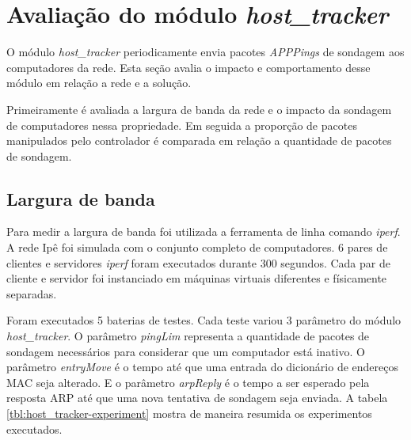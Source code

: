 \break
\section{Avaliação do módulo \emph{host\_tracker}}

O módulo \emph{host\_tracker} periodicamente envia pacotes \emph{APPPings} de
sondagem aos computadores da rede. 
Esta seção avalia o impacto e comportamento desse módulo em relação a rede e 
a solução.

Primeiramente é avaliada a largura de banda da rede e o impacto da sondagem 
de computadores nessa propriedade.
Em seguida a proporção de pacotes manipulados pelo controlador é comparada
em relação a quantidade de pacotes de sondagem.

\subsection{Largura de banda}

Para medir a largura de banda foi utilizada a ferramenta de linha comando
\emph{iperf}.
A rede Ipê foi simulada com o conjunto completo de computadores.
6 pares de clientes e servidores \emph{iperf} foram executados durante 300 
segundos.
Cada par de cliente e servidor foi instanciado em máquinas virtuais 
diferentes e físicamente separadas.



Foram executados 5 baterias de testes.
Cada teste variou 3 parâmetro do módulo \emph{host\_tracker}.
O parâmetro \emph{pingLim} representa a quantidade de pacotes de sondagem 
necessários para considerar que um computador está inativo.
O parâmetro \emph{entryMove} é o tempo até que uma entrada do dicionário de 
endereços MAC seja alterado.
E o parâmetro \emph{arpReply} é o tempo a ser esperado pela resposta ARP até
que uma nova tentativa de sondagem seja enviada.
A tabela \ref{tbl:host_tracker-experiment} mostra de maneira resumida os 
experimentos executados.

